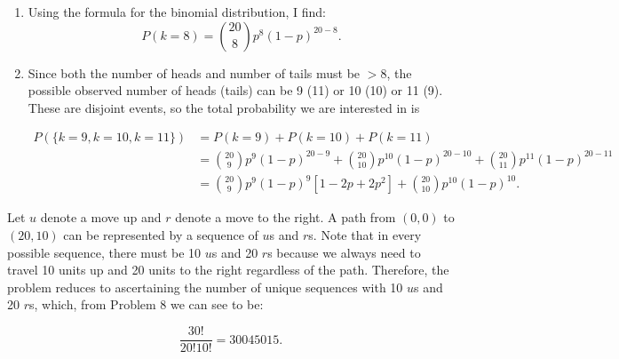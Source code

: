 \begin{problem}{9} $ $

	\begin{enumerate}
		\item
			Using the formula for the binomial distribution, I find:
			\begin{equation*}
				P(k= 8) = \binom{20}{8} p^8(1-p)^{20-8}.
			\end{equation*}
			
		\item
			Since both the number of heads and number of tails must be $>8$, the possible observed number of heads (tails) can be 9 (11) or 10 (10) or 11 (9).  These are disjoint events, so the total probability we are interested in is 
			
			\begin{align*}
				P(\{k=9, k=10, k=11\}) &=P(k=9)+P(k=10)+P(k=11) \\
				& =  \binom{20}{9} p^9(1-p)^{20-9}+ \binom{20}{10} p^{10}(1-p)^{20-10}+ \binom{20}{11} p^{11}(1-p)^{20-11} \\
			& =\binom{20}{9}p^9(1-p)^{9}\left [1-2p+2p^2\right]+\binom{20}{10} p^{10}(1-p)^{10}.
			\end{align*}
	\end{enumerate}


\end{problem}

\begin{problem}{10} Let $u$ denote a move up and $r$ denote a move to the right.  A path from $(0, 0)$ to $(20,10)$ can be represented by a sequence of $u$s and $r$s.  Note that in every possible sequence, there must be 10 $u$s and 20 $r$s because we always need to travel 10 units up and 20 units to the right regardless of the path.  Therefore, the problem reduces to ascertaining the number of unique sequences with 10 $u$s and 20 $r$s, which, from Problem 8 we can see to be:

\begin{equation*}
\frac{30!}{20! 10!}= 30045015.
\end{equation*}

\end{problem}

